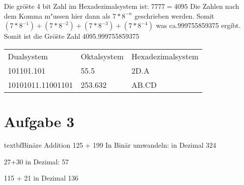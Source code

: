 \documentclass[a4paper,11pt,titlepage]{article}
\begin{document}
Die gr\"o\"ste 4 bit Zahl im Hexadezimalsystem ist: \newline
$7777 = 4095$
Die Zahlen nach dem Komma m"ussen hier dann als $7 * 8^{-n}$ geschrieben werden. Somit $(7 * 8^{-1}) + (7 * 8^{-2}) + (7 * 8^{-3}) + (7 * 8^{-4})$ was ca.999755859375 ergibt. \newline
Somit ist die Gr\"o\"ste Zahl 4095.999755859375 \newline

\begin{table}
\begin{tabular}{lll}
Dualsystem        & Oktalsystem & Hexadezimalsystem \\
101101.101        & 55.5        & 2D.A              \\
10101011.11001101 & 253.632     & AB.CD             \\
\end{tabular}
\end{table}
    

\pagebreak

\section{Aufgabe 3}
textbf{Bin\"are Addition}
125 + 199 \newline
In Bin\"ar umwandeln:    \newline
in Dezimal 324 \newline

27+30    \newline
in Dezimal: 57 \newline

115 + 21   \newline
in Dezimal 136 \newline

\pagebreak
\end{document}
